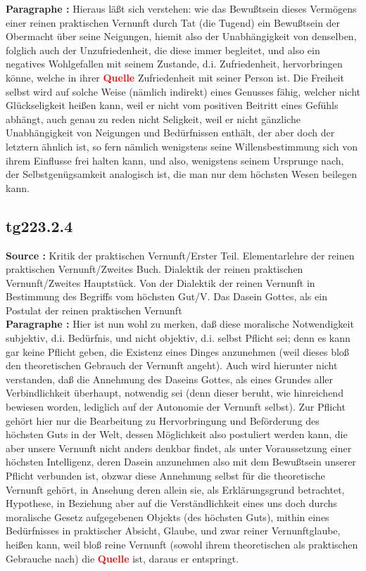\documentclass[a4paper,12pt,twoside]{book}
\newcommand{\match}[1]{\textcolor{red}{\textbf{#1}}}
\begin{document}
	\noindent\textbf{Paragraphe : }Hieraus läßt sich verstehen: wie das Bewußtsein dieses Vermögens einer reinen praktischen Vernunft durch Tat (die Tugend) ein Bewußtsein der Obermacht über seine Neigungen, hiemit also der Unabhängigkeit von denselben, folglich auch der Unzufriedenheit, die diese immer begleitet, und also ein negatives Wohlgefallen mit seinem Zustande, d.i. Zufriedenheit, hervorbringen könne, welche in ihrer \match{Quelle} Zufriedenheit mit seiner Person ist. Die Freiheit selbst wird auf solche Weise (nämlich indirekt) eines Genusses fähig, welcher nicht Glückseligkeit heißen kann, weil er nicht vom positiven Beitritt eines Gefühls abhängt, auch genau zu reden nicht Seligkeit, weil er nicht gänzliche Unabhängigkeit von Neigungen und Bedürfnissen enthält, der aber doch der letztern ähnlich ist, so fern nämlich wenigstens seine Willensbestimmung sich von ihrem Einflusse frei halten kann, und also, wenigstens seinem Ursprunge nach, der Selbstgenügsamkeit analogisch ist, die man nur dem höchsten Wesen beilegen kann. 
	
	\subsection*{tg223.2.4} 
	\textbf{Source : }Kritik der praktischen Vernunft/Erster Teil. Elementarlehre der reinen praktischen Vernunft/Zweites Buch. Dialektik der reinen praktischen Vernunft/Zweites Hauptstück. Von der Dialektik der reinen Vernunft in Bestimmung des Begriffs vom höchsten Gut/V. Das Dasein Gottes, als ein Postulat der reinen praktischen Vernunft\\  
	
	\noindent\textbf{Paragraphe : }Hier ist nun wohl zu merken, daß diese moralische Notwendigkeit subjektiv, d.i. Bedürfnis, und nicht objektiv, d.i. selbst Pflicht sei; denn es kann gar keine Pflicht geben, die Existenz eines Dinges anzunehmen (weil dieses bloß den theoretischen Gebrauch der Vernunft angeht). Auch wird hierunter nicht verstanden, daß die Annehmung des Daseins Gottes, als eines Grundes aller Verbindlichkeit überhaupt, notwendig sei (denn dieser beruht, wie hinreichend bewiesen worden, lediglich auf der Autonomie der Vernunft selbst). Zur Pflicht gehört hier nur die Bearbeitung zu Hervorbringung und Beförderung des höchsten  Guts in der Welt, dessen Möglichkeit also postuliert werden kann, die aber unsere Vernunft nicht anders denkbar findet, als unter Voraussetzung einer höchsten Intelligenz, deren Dasein anzunehmen also mit dem Bewußtsein unserer Pflicht verbunden ist, obzwar diese Annehmung selbst für die theoretische Vernunft gehört, in Ansehung deren allein sie, als Erklärungsgrund betrachtet, Hypothese, in Beziehung aber auf die Verständlichkeit eines uns doch durchs moralische Gesetz aufgegebenen Objekts (des höchsten Guts), mithin eines Bedürfnisses in praktischer Absicht, Glaube, und zwar reiner Vernunftglaube, heißen kann, weil bloß reine Vernunft (sowohl ihrem theoretischen als praktischen Gebrauche nach) die \match{Quelle} ist, daraus er entspringt. 
	
\end{document}
